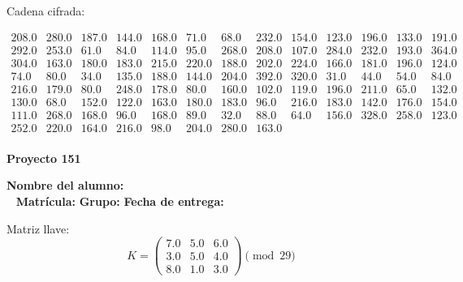 \documentclass[12pt]{article}
\begin{document}
Cadena cifrada:
\begin{center}
$\begin{array}{lllllllllllll}
208.0 & 280.0 & 187.0 & 144.0 & 168.0 & 71.0 & 68.0 & 232.0 & 154.0 & 123.0 & 196.0 & 133.0 & 191.0\\
292.0 & 253.0 & 61.0 & 84.0 & 114.0 & 95.0 & 268.0 & 208.0 & 107.0 & 284.0 & 232.0 & 193.0 & 364.0\\
304.0 & 163.0 & 180.0 & 183.0 & 215.0 & 220.0 & 188.0 & 202.0 & 224.0 & 166.0 & 181.0 & 196.0 & 124.0\\
74.0 & 80.0 & 34.0 & 135.0 & 188.0 & 144.0 & 204.0 & 392.0 & 320.0 & 31.0 & 44.0 & 54.0 & 84.0\\
216.0 & 179.0 & 80.0 & 248.0 & 178.0 & 80.0 & 160.0 & 102.0 & 119.0 & 196.0 & 211.0 & 65.0 & 132.0\\
130.0 & 68.0 & 152.0 & 122.0 & 163.0 & 180.0 & 183.0 & 96.0 & 216.0 & 183.0 & 142.0 & 176.0 & 154.0\\
111.0 & 268.0 & 168.0 & 96.0 & 168.0 & 89.0 & 32.0 & 88.0 & 64.0 & 156.0 & 328.0 & 258.0 & 123.0\\
252.0 & 220.0 & 164.0 & 216.0 & 98.0 & 204.0 & 280.0 & 163.0\\
\end{array}$
\end{center}

\newpage


\textbf{Proyecto 151}

\textbf{Nombre del alumno:} \underline{\hspace{13cm}}\\\
\vspace{1cm}
\textbf{Matrícula:} \underline{\hspace{4cm}} \hspace{1cm}
\textbf{Grupo:} \underline{\hspace{2cm}}
\textbf{Fecha de entrega:} \underline{\hspace{2cm}}

\medskip

Matriz llave:
\[
K = \begin{pmatrix}
7.0 & 5.0 & 6.0\\
3.0 & 5.0 & 4.0\\
8.0 & 1.0 & 3.0
\end{pmatrix} \pmod{29}
\]
\end{document}
